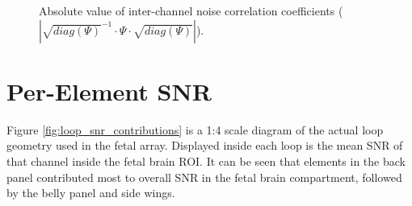 \begin{figure}
    \caption{Absolute value of inter-channel noise correlation coefficients ($|\sqrt{diag(\Psi)}^{-1} \cdot \Psi \cdot
    \sqrt{diag(\Psi)}|$).}
\label{fig:noise_cor}
\end{figure}

\section{Per-Element SNR}
Figure \ref{fig:loop_snr_contributions} is a 1:4 scale diagram of the actual loop geometry used in the fetal array.
Displayed inside each loop is the mean SNR of that channel inside the fetal brain ROI. It can be seen that elements in
the back panel contributed most to overall SNR in the fetal brain compartment, followed by the belly panel and side wings.

